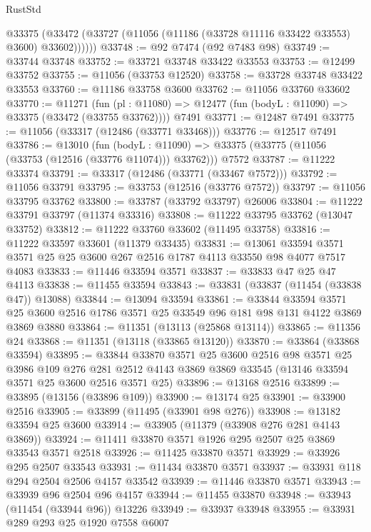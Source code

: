 \begin{lexlean}{RustStd}
\begin{coremodule}
        @33375 (@33472 (@33727 (@11056 (@11186 (@33728 @11116 @33422 @33553) @3600) @33602))))))
@33748 := @92 @7474 (@92 @7483 @98)
@33749 := @33744 @33748
@33752 := @33721 @33748 @33422 @33553
@33753 := @12499 @33752
@33755 := @11056 (@33753 @12520)
@33758 := @33728 @33748 @33422 @33553
@33760 := @11186 @33758 @3600
@33762 := @11056 @33760 @33602
@33770 := @11271
    (fun (pl : @11080) => @12477 (fun (bodyL : @11090) => @33375 (@33472 (@33755 @33762))))
    @7491
@33771 := @12487 @7491
@33775 := @11056 (@33317 (@12486 (@33771 @33468)))
@33776 := @12517 @7491
@33786 := @13010
    (fun (bodyL : @11090) => @33375 (@33775 (@11056 (@33753 (@12516 (@33776 @11074))) @33762)))
    @7572
@33787 := @11222 @33374
@33791 := @33317 (@12486 (@33771 (@33467 @7572)))
@33792 := @11056 @33791
@33795 := @33753 (@12516 (@33776 @7572))
@33797 := @11056 @33795 @33762
@33800 := @33787 (@33792 @33797) @26006
@33804 := @11222 @33791 @33797 (@11374 @33316)
@33808 := @11222 @33795 @33762 (@13047 @33752)
@33812 := @11222 @33760 @33602 (@11495 @33758)
@33816 := @11222 @33597 @33601 (@11379 @33435)
@33831 := @13061
    @33594
    @3571
    @3571
    @25
    @25
    @3600
    @267
    @2516
    @1787
    @4113
    @33550
    @98
    @4077
    @7517
    @4083
@33833 := @11446 @33594 @3571
@33837 := @33833 @47 @25 @47 @4113
@33838 := @11455 @33594
@33843 := @33831 (@33837 (@11454 (@33838 @47)) @13088)
@33844 := @13094 @33594
@33861 := @33844
    @33594
    @3571
    @25
    @3600
    @2516
    @1786
    @3571
    @25
    @33549
    @96
    @181
    @98
    @131
    @4122
    @3869
    @3869
    @3880
@33864 := @11351 (@13113 (@25868 @13114))
@33865 := @11356 @24
@33868 := @11351 (@13118 (@33865 @13120))
@33870 := @33864 (@33868 @33594)
@33895 := @33844
    @33870
    @3571
    @25
    @3600
    @2516
    @98
    @3571
    @25
    @3986
    @109
    @276
    @281
    @2512
    @4143
    @3869
    @3869
    @33545
    (@13146 @33594 @3571 @25 @3600 @2516 @3571 @25)
@33896 := @13168 @2516
@33899 := @33895 (@13156 (@33896 @109))
@33900 := @13174 @25
@33901 := @33900 @2516
@33905 := @33899 (@11495 (@33901 @98 @276))
@33908 := @13182 @33594 @25 @3600
@33914 := @33905 (@11379 (@33908 @276 @281 @4143 @3869))
@33924 := @11411 @33870 @3571 @1926 @295 @2507 @25 @3869 @33543 @3571 @2518
@33926 := @11425 @33870 @3571
@33929 := @33926 @295 @2507 @33543
@33931 := @11434 @33870 @3571
@33937 := @33931 @118 @294 @2504 @2506 @4157 @33542
@33939 := @11446 @33870 @3571
@33943 := @33939 @96 @2504 @96 @4157
@33944 := @11455 @33870
@33948 := @33943 (@11454 (@33944 @96)) @13226
@33949 := @33937 @33948
@33955 := @33931 @289 @293 @25 @1920 @7558 @6007

\end{coremodule}
\end{lexlean}
